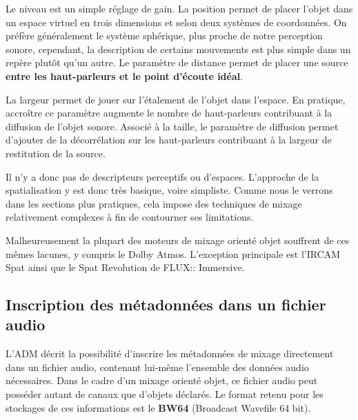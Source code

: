 \documentclass[
  letterpaper,
  DIV=11,
  numbers=noendperiod]{scrreprt}
\begin{document}
Le niveau est un simple réglage de gain. La position permet de placer
l'objet dans un espace virtuel en trois dimensions et selon deux
systèmes de coordonnées. On préfère généralement le système sphérique,
plus proche de notre perception sonore, cependant, la description de
certains mouvements est plus simple dans un repère plutôt qu'un autre.
Le paramètre de distance permet de placer une source \textbf{entre les
haut-parleurs et le point d'écoute idéal}.

La largeur permet de jouer sur l'étalement de l'objet dans l'espace. En
pratique, accroître ce paramètre augmente le nombre de haut-parleurs
contribuant à la diffusion de l'objet sonore. Associé à la taille, le
paramètre de diffusion permet d'ajouter de la décorrélation sur les
haut-parleurs contribuant à la largeur de restitution de la source.

Il n'y a donc pas de descripteurs perceptifs ou d'espaces. L'approche de
la spatialisation y est donc très basique, voire simpliste. Comme nous
le verrons dans les sections plus pratiques, cela impose des techniques
de mixage relativement complexes à fin de contourner ses limitations.

\begin{tcolorbox}[enhanced jigsaw, leftrule=.75mm, arc=.35mm, bottomtitle=1mm, colback=white, colbacktitle=quarto-callout-note-color!10!white, opacityback=0, left=2mm, rightrule=.15mm, opacitybacktitle=0.6, breakable, toptitle=1mm, titlerule=0mm, bottomrule=.15mm, toprule=.15mm, coltitle=black, title=\textcolor{quarto-callout-note-color}{\faInfo}\hspace{0.5em}{Note}]

Malheureusement la plupart des moteurs de mixage orienté objet souffrent
de ces mêmes lacunes, y compris le Dolby Atmos. L'exception principale
est l'IRCAM Spat ainsi que le Spat Revolution de FLUX:: Immersive.

\end{tcolorbox}

\hypertarget{inscription-des-muxe9tadonnuxe9es-dans-un-fichier-audio}{%
\subsection{Inscription des métadonnées dans un fichier
audio}\label{inscription-des-muxe9tadonnuxe9es-dans-un-fichier-audio}}

L'ADM décrit la possibilité d'inscrire les métadonnées de mixage
directement dans un fichier audio, contenant lui-même l'ensemble des
données audio nécessaires. Dans le cadre d'un mixage orienté objet, ce
fichier audio peut posséder autant de canaux que d'objets déclarés. Le
format retenu pour les stockages de ces informations est le
\textbf{BW64} (Broadcast Wavefile 64 bit).
\end{document}
